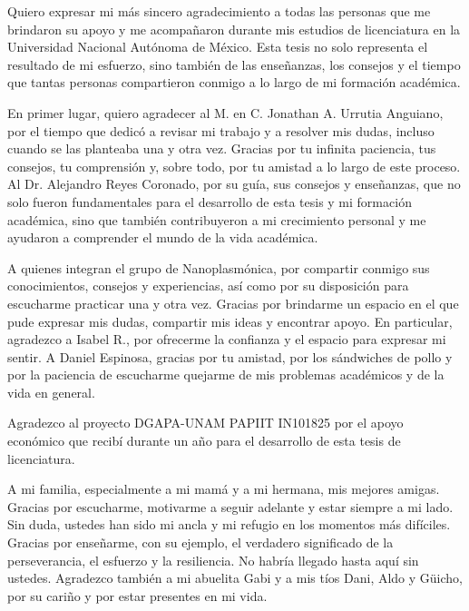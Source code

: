 
\begin{acknowledgements}


Quiero expresar mi más sincero agradecimiento a todas las personas que me brindaron su apoyo y me acompañaron durante mis estudios de licenciatura en la Universidad Nacional Autónoma de México. Esta tesis no solo representa el resultado de mi esfuerzo, sino también de las enseñanzas, los consejos y el tiempo que tantas personas compartieron conmigo a lo largo de mi formación académica.

En primer lugar, quiero agradecer al M. en C. Jonathan A. Urrutia Anguiano, por el tiempo que dedicó a revisar mi trabajo y a resolver mis dudas, incluso cuando se las planteaba una y otra vez. Gracias por tu infinita paciencia, tus consejos, tu comprensión y, sobre todo, por tu amistad a lo largo de este proceso. Al Dr. Alejandro Reyes Coronado, por su guía, sus consejos y enseñanzas, que no solo fueron fundamentales para el desarrollo de esta tesis y mi formación académica, sino que también contribuyeron a mi crecimiento personal y me ayudaron a comprender el mundo de la vida académica.

A quienes integran el grupo de Nanoplasmónica, por compartir conmigo sus conocimientos, consejos y experiencias, así como por su disposición para escucharme practicar una y otra vez. Gracias por brindarme un espacio en el que pude expresar mis dudas, compartir mis ideas y encontrar apoyo. En particular, agradezco a Isabel R., por ofrecerme la confianza y el espacio para expresar mi sentir. A Daniel Espinosa, gracias por tu amistad, por los sándwiches de pollo y por la paciencia de escucharme quejarme de mis problemas académicos y de la vida en general.

Agradezco al proyecto DGAPA-UNAM PAPIIT IN101825 por el apoyo económico que recibí durante un año para el desarrollo de esta tesis de licenciatura. 

A mi familia, especialmente a mi mamá y a mi hermana, mis mejores amigas. Gracias por escucharme, motivarme a seguir adelante y estar siempre a mi lado. Sin duda, ustedes han sido mi ancla y mi refugio en los momentos más difíciles. Gracias por enseñarme, con su ejemplo, el verdadero significado de la perseverancia, el esfuerzo y la resiliencia. No habría llegado hasta aquí sin ustedes. Agradezco también a mi abuelita Gabi y a mis tíos Dani, Aldo y Güicho, por su cariño y por estar presentes en mi vida.


\end{acknowledgements}
